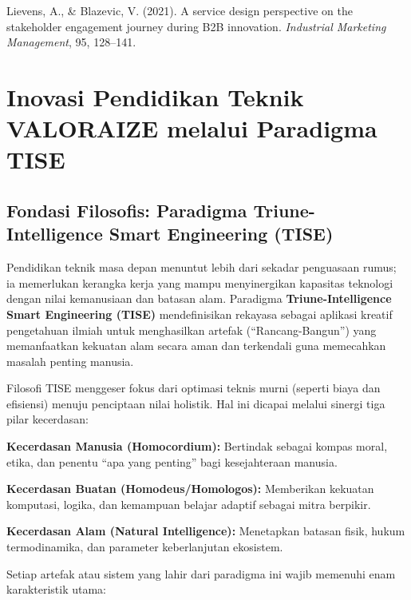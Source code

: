 \documentclass[
  letterpaper,
  DIV=11,
  numbers=noendperiod]{scrreprt}
\begin{document}
Lievens, A., \& Blazevic, V. (2021). A service design perspective on the
stakeholder engagement journey during B2B innovation. \emph{Industrial
Marketing Management}, 95, 128--141.


\chapter{Inovasi Pendidikan Teknik VALORAIZE melalui Paradigma
TISE}\label{inovasi-pendidikan-teknik-valoraize-melalui-paradigma-tise}

\section{Fondasi Filosofis: Paradigma Triune-Intelligence Smart
Engineering
(TISE)}\label{fondasi-filosofis-paradigma-triune-intelligence-smart-engineering-tise}

Pendidikan teknik masa depan menuntut lebih dari sekadar penguasaan
rumus; ia memerlukan kerangka kerja yang mampu menyinergikan kapasitas
teknologi dengan nilai kemanusiaan dan batasan alam. Paradigma
\textbf{Triune-Intelligence Smart Engineering (TISE)} mendefinisikan
rekayasa sebagai aplikasi kreatif pengetahuan ilmiah untuk menghasilkan
artefak (``Rancang-Bangun'') yang memanfaatkan kekuatan alam secara aman
dan terkendali guna memecahkan masalah penting manusia.

Filosofi TISE menggeser fokus dari optimasi teknis murni (seperti biaya
dan efisiensi) menuju penciptaan nilai holistik. Hal ini dicapai melalui
sinergi tiga pilar kecerdasan:

\textbf{Kecerdasan Manusia (Homocordium):} Bertindak sebagai kompas
moral, etika, dan penentu ``apa yang penting'' bagi kesejahteraan
manusia.

\textbf{Kecerdasan Buatan (Homodeus/Homologos):} Memberikan kekuatan
komputasi, logika, dan kemampuan belajar adaptif sebagai mitra berpikir.

\textbf{Kecerdasan Alam (Natural Intelligence):} Menetapkan batasan
fisik, hukum termodinamika, dan parameter keberlanjutan ekosistem.

Setiap artefak atau sistem yang lahir dari paradigma ini wajib memenuhi
enam karakteristik utama:
\end{document}
